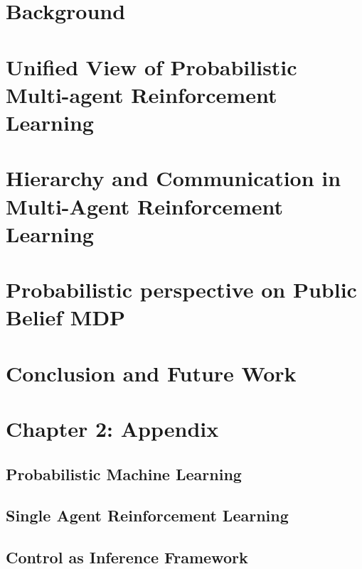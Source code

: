 \documentclass{report}
\begin{document}
\chapter{Background}


\chapter{Unified View of Probabilistic Multi-agent Reinforcement Learning}


\chapter{Hierarchy and Communication in Multi-Agent Reinforcement Learning}


\chapter{Probabilistic perspective on Public Belief MDP}


\chapter{Conclusion and Future Work}


\appendix

% 



\chapter{Chapter 2: Appendix}

\section {Probabilistic Machine Learning}


\section {Single Agent Reinforcement Learning}


\section {Control as Inference Framework}

\end{document}
